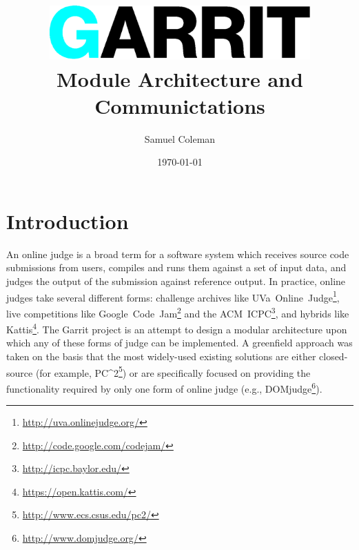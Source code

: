 \documentclass[11pt,letterpaper]{article}
\begin{document}
\title{\includegraphics[width=0.75\textwidth]{logo.eps}\\
Module Architecture and Communictations}
\author{Samuel Coleman}
\date{\today}

\hypersetup{pageanchor=false}
\begin{titlepage}

\maketitle
\thispagestyle{empty}

\end{titlepage}
\hypersetup{pageanchor=true}

\tableofcontents

\newpage

\section{Introduction}
\label{introduction}

An online judge is a broad term for a software system which receives source
code submissions from users, compiles and runs them against a set of input
data, and judges the output of the submission against reference output. In
practice, online judges take several different forms: challenge archives like
UVa~Online~Judge\footnote{\url{http://uva.onlinejudge.org/}}, live competitions
like Google~Code~Jam\footnote{\url{http://code.google.com/codejam/}} and the
ACM~ICPC\footnote{\url{http://icpc.baylor.edu/}}, and hybrids like
Kattis\footnote{\url{https://open.kattis.com/}}. The Garrit project is an
attempt to design a modular architecture upon which any of these forms of judge
can be implemented. A greenfield approach was taken on the basis that the most
widely-used existing solutions are either closed-source (for example,
PC\textasciicircum2\footnote{\url{http://www.ecs.csus.edu/pc2/}}) or are
specifically focused on providing the functionality required by only one form
of online judge (e.g., DOMjudge\footnote{\url{http://www.domjudge.org/}}).
\end{document}

